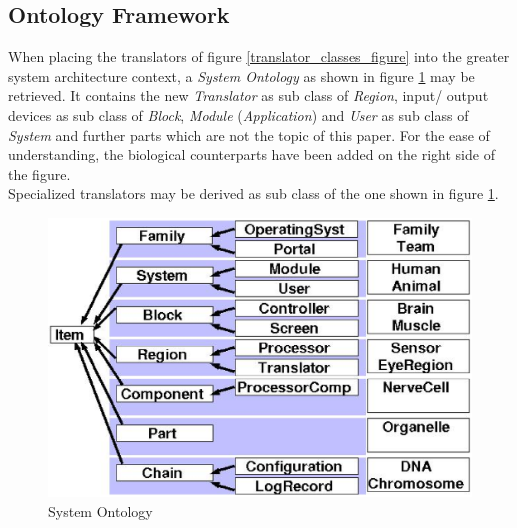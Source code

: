 %
%
%
%
%
%
%

\subsection{Ontology Framework}
\label{ontology_framework_heading}

When placing the translators of figure \ref{translator_classes_figure} into the
greater system architecture context, a \emph{System Ontology} as shown in
figure \ref{system_ontology_figure} may be retrieved. It contains the new
\emph{Translator} as sub class of \emph{Region}, input/ output devices as sub
class of \emph{Block}, \emph{Module} (\emph{Application}) and \emph{User} as sub
class of \emph{System} and further parts which are not the topic of this paper.
For the ease of understanding, the biological counterparts have been added on
the right side of the figure.\\
Specialized translators may be derived as sub class of the one shown in figure
\ref{system_ontology_figure}.

\begin{figure}[ht]
    \begin{center}
        \includegraphics[scale=0.3]{vector/system_ontology.eps}
        \caption{System Ontology}
        \label{system_ontology_figure}
    \end{center}
\end{figure}


